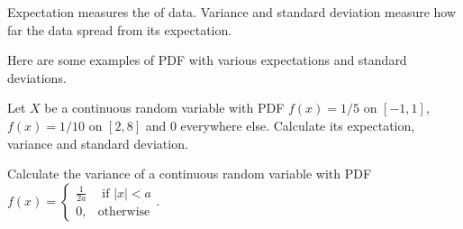\documentclass[../main.tex]{subfiles}
\begin{document}
Expectation measures the  of data. Variance and standard deviation measure how far the data spread from its expectation.
\begin{example} \label{ex:crv-shapes}
  Here are some examples of PDF with various expectations and standard deviations.

  \begin{center}

  \end{center}
\end{example}
\clearpage

\begin{example} \label{ex:crv-two-piece-expectation}
  Let \(X\) be a continuous random variable with PDF \(f(x) = 1/5\) on \([-1, 1]\), \(f(x) = 1/10\) on \([2,8]\) and \(0\) everywhere else.  Calculate its expectation, variance and standard deviation.

\end{example}

\begin{exercise} \label{ex:crv-variance-uniform}
Calculate the variance of a continuous random variable with PDF \(f(x) = \begin{cases} \frac{1}{2a} &\text{ if } |x| < a \\0,&\text{otherwise} \end{cases}\).

  \blanks*
\end{exercise}
\clearpage
\end{document}
